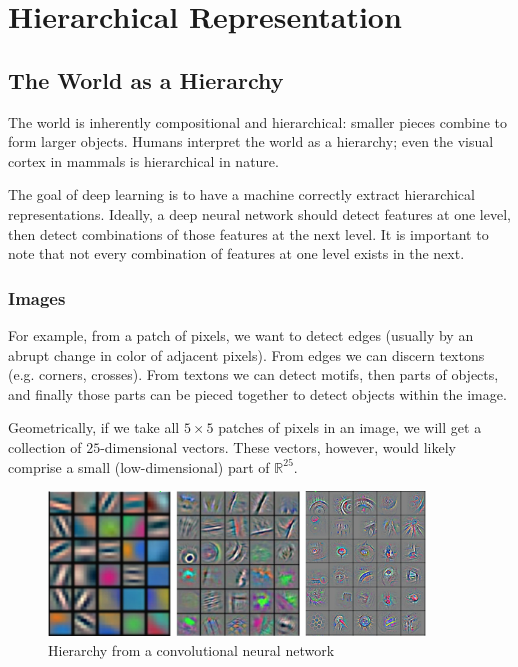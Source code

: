 \chapter{Hierarchical Representation}\label{chp:Hierarchical Representation}

\section{The World as a Hierarchy}

The world is inherently compositional and hierarchical: smaller pieces combine to form larger objects.
Humans interpret the world as a hierarchy; even the visual cortex in mammals is hierarchical in nature.

The goal of deep learning is to have a machine correctly extract hierarchical representations.
Ideally, a deep neural network should detect features at one level, then detect combinations of those features at the next level.
It is important to note that not every combination of features at one level exists in the next.

\subsection{Images}

For example, from a patch of pixels, we want to detect edges (usually by an abrupt change in color of adjacent pixels).
From edges we can discern textons (e.g. corners, crosses).
From textons we can detect motifs, then parts of objects, and finally those parts can be pieced together to detect objects within the image.

Geometrically, if we take all $5\times5$ patches of pixels in an image, we will get a collection of $25$-dimensional vectors.
These vectors, however, would likely comprise a small (low-dimensional) part of $\mathbb{R}^{25}$.

\begin{figure}[ht]
\centering
\includegraphics[width=100mm]{figs/cnn_hierarchy.png}
\caption{Hierarchy from a convolutional neural network}
\label{fig:cnn_hierarchy}
\end{figure}

